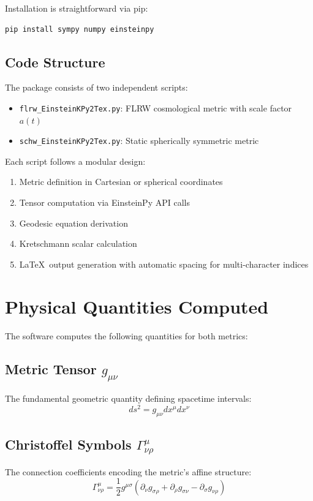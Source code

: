 \documentclass[11pt,a4paper]{article}
\begin{document}
Installation is straightforward via pip:
\begin{lstlisting}[language=bash]
pip install sympy numpy einsteinpy
\end{lstlisting}

\subsection{Code Structure}

The package consists of two independent scripts:
\begin{itemize}
    \item \texttt{flrw\_EinsteinKPy2Tex.py}: FLRW cosmological metric with scale factor $a(t)$
    \item \texttt{schw\_EinsteinKPy2Tex.py}: Static spherically symmetric metric
\end{itemize}

Each script follows a modular design:
\begin{enumerate}
    \item Metric definition in Cartesian or spherical coordinates
    \item Tensor computation via EinsteinPy API calls
    \item Geodesic equation derivation
    \item Kretschmann scalar calculation
    \item \LaTeX\ output generation with automatic spacing for multi-character indices
\end{enumerate}

\section{Physical Quantities Computed}

The software computes the following quantities for both metrics:

\subsection{Metric Tensor $g_{\mu\nu}$}
The fundamental geometric quantity defining spacetime intervals:
\begin{equation}
ds^2 = g_{\mu\nu} dx^\mu dx^\nu
\end{equation}

\subsection{Christoffel Symbols $\Gamma^{\mu}_{\nu\rho}$}
The connection coefficients encoding the metric's affine structure:
\begin{equation}
\Gamma^{\mu}_{\nu\rho} = \frac{1}{2} g^{\mu\sigma} \left( \partial_\nu g_{\sigma\rho} + \partial_\rho g_{\sigma\nu} - \partial_\sigma g_{\nu\rho} \right)
\end{equation}
\end{document}
